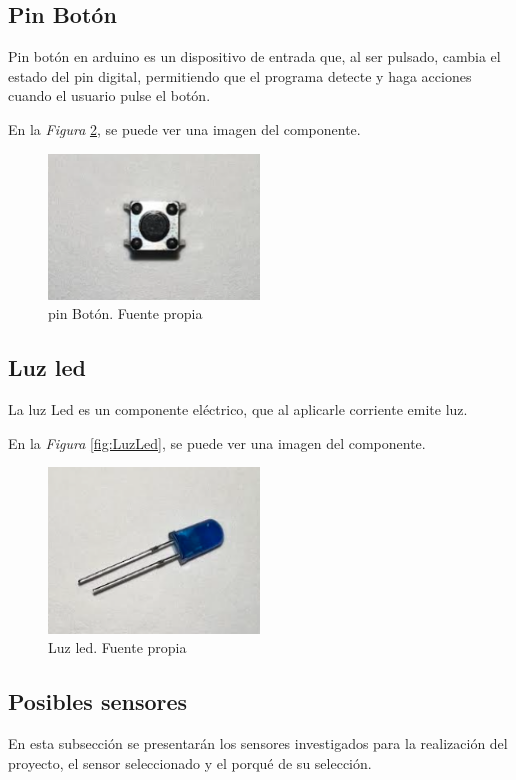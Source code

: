 \subsection{Pin Botón}
Pin botón en arduino es un dispositivo de entrada que, al ser pulsado, cambia el estado del pin digital, permitiendo que el programa detecte y haga acciones cuando el usuario pulse el botón.

En la \textit{Figura} \ref{fig:pinBoton}, se puede ver una imagen del componente.

\begin{figure}[h]
        \centering
        \includegraphics[width=0.5\textwidth]{img/pinBoton.png}
        \caption{pin Botón. Fuente propia}
        \label{fig:pinBoton}
    \end{figure}
\subsection{Luz led}
La luz Led es un componente eléctrico, que al aplicarle corriente emite luz.

En la \textit{Figura} \ref{fig:LuzLed}, se puede ver una imagen del componente.

\begin{figure}[h]
        \centering
        \includegraphics[width=0.5\textwidth]{img/Luzled.png}
        \caption{Luz led. Fuente propia}
        \label{fig:pinBoton}
    \end{figure}
    
\subsection{Posibles sensores}
En esta subsección se presentarán los sensores investigados para la realización del proyecto, el sensor seleccionado y el porqué de su selección.
